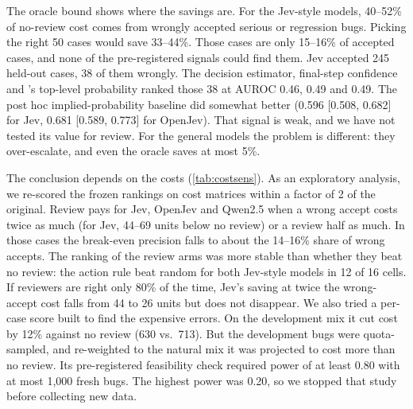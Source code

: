 The oracle bound shows where the savings are. For the Jev-style models, 40--52\%
of no-review cost comes from wrongly accepted serious or regression bugs. Picking the right 50 cases would save
33--44\%. Those cases are
only 15--16\% of accepted cases, and none of the pre-registered signals
could find them. Jev accepted 245 held-out cases, 38 of them
wrongly. The decision estimator, final-step confidence and \score{}'s
top-level probability ranked those 38 at AUROC 0.46, 0.49 and 0.49. The post hoc
implied-probability baseline did somewhat better (0.596 [0.508, 0.682]
for Jev, 0.681 [0.589, 0.773] for OpenJev). That signal is weak,
and we have not tested its value for review. For the general models the
problem is different: they over-escalate, and even the oracle saves at
most 5\%.

\begin{coltable}
\centering
\caption{Exploratory cost sensitivity: best feasible arm minus no review
(negative, in bold: review reduces cost), rankings frozen. $m$ scales
wrong-accept costs, $h$ is the human cost per escalation and $p^{*}$ the
break-even precision. $^{\dagger}$The pre-registered table.}
\label{tab:costsens}
\small
\resizebox{\linewidth}{!}{}
\end{coltable}

The conclusion depends on the costs (\cref{tab:costsens}). As an exploratory analysis, we re-scored the frozen rankings
on cost matrices within a factor of 2 of the original. Review pays for
Jev, OpenJev and Qwen2.5 when a wrong accept costs twice as much (for
Jev, 44--69 units below no review) or a review half as much. In those
cases the break-even precision falls to about the 14--16\% share of wrong
accepts. The ranking of the review arms was more stable than whether they beat
no review: the action rule beat random for both Jev-style models in 12 of
16 cells. If reviewers are right only 80\% of the time, Jev's saving at twice
the wrong-accept cost falls from 44 to 26 units but does not
disappear.
We also tried a per-case score built to find the expensive errors. On
the development mix it cut cost by 12\% against no review (630 vs.\ 713). But the development bugs were quota-sampled, and
re-weighted to the
natural mix it was projected to cost more than no review. Its
pre-registered feasibility check required power of at least 0.80 with at
most 1{,}000 fresh bugs. The highest power was 0.20, so we stopped that
study before collecting new data.

